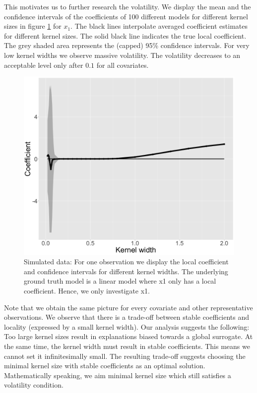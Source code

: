 \documentclass[]{krantz}
\begin{document}
This motivates us to further research the volatility. We display the
mean and the confidence intervals of the coefficients of 100 different
models for different kernel sizes in figure \ref{fig:lime-fig11} for
\(x_1\). The black lines interpolate averaged coefficient estimates for
different kernel sizes. The solid black line indicates the true local
coefficient. The grey shaded area represents the (capped) 95\%
confidence intervals. For very low kernel widths we observe massive
volatility. The volatility decreases to an acceptable level only after
\(0.1\) for all covariates.

\begin{figure}

{\centering \includegraphics[width=0.99\linewidth]{images/04-09-11-1} 

}

\caption{Simulated data: For one observation we display the local coefficient and confidence intervals for different kernel widths. The underlying ground truth model is a linear model where x1 only has a local coefficient. Hence, we only investigate x1.}\label{fig:lime-fig11}
\end{figure}

Note that we obtain the same picture for every covariate and other
representative observations. We observe that there is a trade-off
between stable coefficients and locality (expressed by a small kernel
width). Our analysis suggests the following: Too large kernel sizes
result in explanations biased towards a global surrogate. At the same
time, the kernel width must result in stable coefficients. This means we
cannot set it infinitesimally small. The resulting trade-off suggests
choosing the minimal kernel size with stable coefficients as an optimal
solution. Mathematically speaking, we aim minimal kernel size which
still satisfies a volatility condition.
\end{document}
